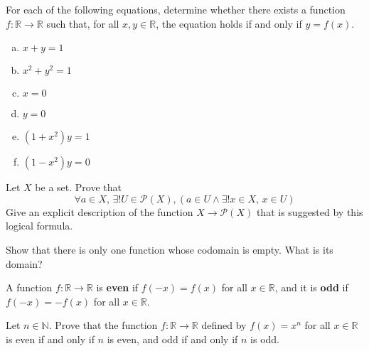 \begin{chapex}
For each of the following equations, determine whether there exists a function $f : \mathbb{R} \to \mathbb{R}$ such that, for all $x,y \in \mathbb{R}$, the equation holds if and only if $y=f(x)$.
\begin{multicols}{3}
\begin{enumerate}[(a)]
\item $x+y=1$
\item $x^2+y^2=1$
\item $x=0$
\item $y=0$
\item $(1+x^2)y=1$
\item $(1-x^2)y=0$
\end{enumerate}
\end{multicols}
\end{chapex}

\begin{chapex}
Let $X$ be a set. Prove that
\[ \forall a \in X,\, \exists ! U \in \mathcal{P}(X), (a \in U \wedge \exists ! x \in X,\, x \in U) \]
Give an explicit description of the function $X \to \mathcal{P}(X)$ that is suggested by this logical formula.
\end{chapex}

\begin{chapex}
Show that there is only one function whose codomain is empty. What is its domain?
\end{chapex}

\begin{definition}
\label{defEvenOddFunction}
A function $f : \mathbb{R} \to \mathbb{R}$ is \textbf{even} if $f(-x)=f(x)$ for all $x \in \mathbb{R}$, and it is \textbf{odd} if $f(-x)=-f(x)$ for all $x \in \mathbb{R}$.
\end{definition}

\begin{chapex}
Let $n \in \mathbb{N}$. Prove that the function $f : \mathbb{R} \to \mathbb{R}$ defined by $f(x)=x^n$ for all $x \in \mathbb{R}$ is even if and only if $n$ is even, and odd if and only if $n$ is odd.
\end{chapex}


